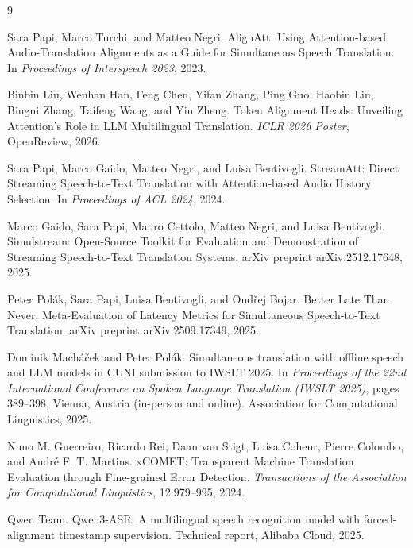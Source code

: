 \documentclass[11pt,twocolumn]{article}
\begin{document}
\begin{thebibliography}{9}

Sara Papi, Marco Turchi, and Matteo Negri.
\newblock AlignAtt: Using Attention-based Audio-Translation Alignments as a
Guide for Simultaneous Speech Translation.
\newblock In \emph{Proceedings of Interspeech 2023}, 2023.

Binbin Liu, Wenhan Han, Feng Chen, Yifan Zhang, Ping Guo, Haobin Lin, Bingni
Zhang, Taifeng Wang, and Yin Zheng.
\newblock Token Alignment Heads: Unveiling Attention's Role in LLM Multilingual
Translation.
\newblock \emph{ICLR 2026 Poster}, OpenReview, 2026.

Sara Papi, Marco Gaido, Matteo Negri, and Luisa Bentivogli.
\newblock StreamAtt: Direct Streaming Speech-to-Text Translation with
Attention-based Audio History Selection.
\newblock In \emph{Proceedings of ACL 2024}, 2024.

Marco Gaido, Sara Papi, Mauro Cettolo, Matteo Negri, and Luisa Bentivogli.
\newblock Simulstream: Open-Source Toolkit for Evaluation and Demonstration of
Streaming Speech-to-Text Translation Systems.
\newblock arXiv preprint arXiv:2512.17648, 2025.

Peter Pol{\'a}k, Sara Papi, Luisa Bentivogli, and Ond{\v{r}}ej Bojar.
\newblock Better Late Than Never: Meta-Evaluation of Latency Metrics for
Simultaneous Speech-to-Text Translation.
\newblock arXiv preprint arXiv:2509.17349, 2025.

Dominik Mach{\'a}{\v{c}}ek and Peter Pol{\'a}k.
\newblock Simultaneous translation with offline speech and LLM models in CUNI
submission to IWSLT 2025.
\newblock In \emph{Proceedings of the 22nd International Conference on Spoken
Language Translation (IWSLT 2025)}, pages 389--398, Vienna, Austria (in-person
and online). Association for Computational Linguistics, 2025.

Nuno M. Guerreiro, Ricardo Rei, Daan van Stigt, Luisa Coheur, Pierre Colombo,
and Andr{\'e} F. T. Martins.
\newblock xCOMET: Transparent Machine Translation Evaluation through Fine-grained
Error Detection.
\newblock \emph{Transactions of the Association for Computational Linguistics},
12:979--995, 2024.

Qwen Team.
\newblock Qwen3-ASR: A multilingual speech recognition model with
forced-alignment timestamp supervision.
\newblock Technical report, Alibaba Cloud, 2025.

\end{thebibliography}
\end{document}

